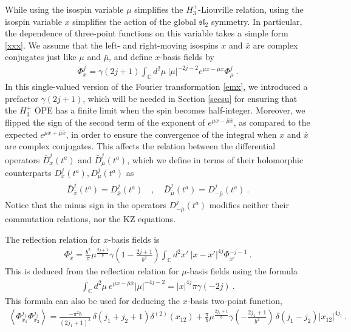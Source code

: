 \documentclass[12pt, a4paper, notitlepage, twoside]{report}
\numberwithin{equation}{section}
\theoremstyle{break}
\begin{document}
While using the isospin variable $\mu$ simplifies the $H_3^+$-Liouville relation, using the isospin variable $x$ simplifies the action of the global $\mathfrak{sl}_2$ symmetry. 
In particular, the dependence of three-point functions on this variable takes a simple form \eqref{xxx}.
We assume that the left- and right-moving isospins $x$ and $\bar x$ are complex conjugates just like $\mu$ and $\bar\mu$, and define $x$-basis fields by 
\begin{align}
 \Phi^j_{x} = \gamma(2j+1)\int_{{\mathbb{C}}} d^2\mu\ |\mu|^{-2j-2} e^{\mu x -\bar{\mu}\bar{x}}\Phi^j_{\mu}\ .
\end{align}
In this single-valued version of the Fourier transformation \eqref{emx}, 
we introduced a prefactor $\gamma(2j+1)$, which will be needed in Section \ref{secsu} for ensuring that the $H_3^+$ OPE has a finite limit when the spin becomes half-integer.
Moreover, we flipped the sign of the second term of the exponent of $e^{\mu x -\bar{\mu}\bar{x}}$, as compared to the expected $e^{\mu x +\bar{\mu}\bar{x}}$, in order to ensure the convergence of the integral when $x$ and $\bar{x}$ are complex conjugates.
This affects the relation between the differential operators $\bar{D}^j_{\bar{x}}(t^a)$ and $\bar{D}^j_{\bar{\mu}}(t^a)$, which we define in terms of their holomorphic counterparts $D^j_x(t^a), D^j_\mu(t^a)$ as 
\begin{align}
 \bar{D}^j_{\bar{x}}(t^a) = D^j_{\bar{x}}(t^a)  \quad , \quad \bar{D}^j_{\bar{\mu}}(t^a) = D^j_{-\bar{\mu}}(t^a)\ . 
\end{align}
Notice that the minus sign in the operators $D^j_{-\bar{\mu}}(t^a)$ modifies neither their commutation relations, nor the KZ equations.

The reflection relation for $x$-basis fields is
\begin{align}
 \Phi^j_{x} = \frac{b^2}{\pi}\mu^{\frac{2j+1}{b}}\gamma(1-\tfrac{2j+1}{b^2})\int_{{\mathbb{C}}}d^2x'\ |x-x'|^{4j}\Phi^{-j-1}_{x'}\ .
\end{align}
This is deduced from the reflection relation for $\mu$-basis fields using the formula
\begin{align}
 \int_{{\mathbb{C}}}d^2\mu\ e^{\mu x-\bar{\mu}\bar{x}} |\mu|^{-4j-2} = |x|^{4j}\pi \gamma(-2j) \ .
\label{icmx}
\end{align}
This formula can also be used for deducing the $x$-basis two-point function,
\begin{align}
 \left\langle \Phi^{j_1}_{x_1} \Phi^{j_2}_{x_2} \right\rangle = \frac{-\pi^2 b}{(2j_1+1)^2}\, \delta(j_1+j_2+1)\delta^{(2)}(x_{12}) 
+ \frac{\pi}{b}\mu^{\frac{2j_1+1}{b}} \gamma(-\tfrac{2j_1+1}{b^2})\, \delta(j_1-j_2)|x_{12}|^{4j_1}\, .
\label{pjpj}
\end{align}
\end{document}
